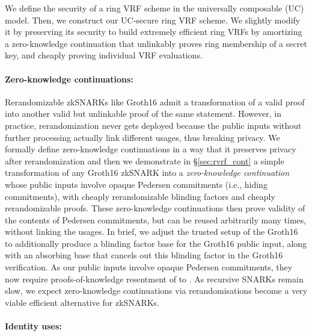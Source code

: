 We define the security of a ring VRF scheme in the universally composable (UC) \cite{canetti1,canetti2} model. Then, we construct our UC-secure ring VRF scheme. We slightly modify it by preserving its security to build extremely efficient 
ring VRFs by amortizing a zero-knowledge continuation that unlinkably
proves ring membership of a secret key, and  cheaply proving
individual VRF evaluations.


\paragraph{Zero-knowledge continuations:}

Rerandomizable zkSNARKs like Groth16 \cite{Groth16} admit a
transformation of a valid proof into another valid but unlinkable
proof of the same statement.  However, in practice, rerandomization
never gets deployed because the public inputs without further processing actually 
link different usages, thus breaking privacy.
We formally define zero-knowledge continuations in a way that it preserves privacy after rerandomization and then  we demonstrate in \S\ref{sec:rvrf_cont} a simple transformation of
any Groth16 zkSNARK into a {\it zero-knowledge continuation} whose
public inputs involve opaque Pedersen commitments (i.e., hiding commitments), with cheaply
rerandomizable blinding factors and cheaply rerandomizable proofs.
These zero-knowledge continuations then prove validity of the contents
of Pedersen commitments, but can be reused arbitrarily many times,
without linking the usages.
In brief, we adjust the trusted setup of the Groth16 to additionally
produce a blinding factor base for the Groth16 public input, 
along with an absorbing base that cancels out this blinding factor in the
Groth16 verification.
As our public inputs involve opaque Pedersen commitments,
they now require proofs-of-knowledge resentment of to \cite{LegoSNARK}. 
As recursive SNARKs remain slow,
we expect zero-knowledge continuations via rerandomisations become a very viable efficient alternative for zkSNARKs.

\paragraph{Identity uses:}

